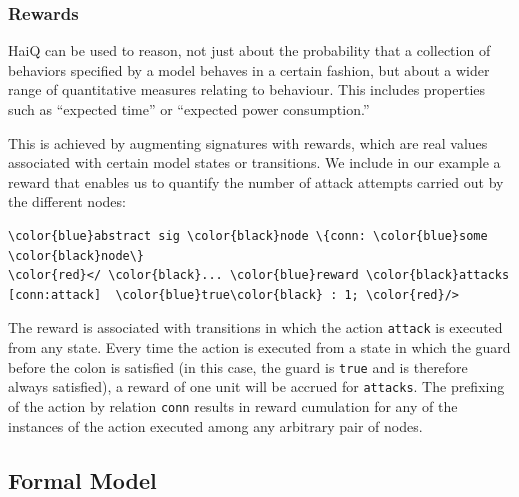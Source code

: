 \documentclass[10pt,journal,compsoc]{IEEEtran}
\begin{document}
\subsubsection{Rewards}
{\sf HaiQ} can be used to reason, not just about the probability that a collection of behaviors specified by a model behaves in a certain fashion, but about a wider range of quantitative measures relating to behaviour. 
This includes properties such as ``expected time'' or ``expected power consumption.'' 

This is achieved by augmenting signatures with rewards, which are real values associated with certain model states or transitions. 
We include in our example a reward that enables us to quantify the number of attack attempts carried out by the different nodes:

{\scriptsize
\begin{Verbatim}[commandchars=\\\{\},codes={\catcode`$=3\catcode`^=7\catcode`_=8}]
\color{blue}abstract sig \color{black}node \{conn: \color{blue}some \color{black}node\}
\color{red}</ \color{black}... \color{blue}reward \color{black}attacks [conn:attack]  \color{blue}true\color{black} : 1; \color{red}/>
\end{Verbatim}
}

The reward is associated with transitions in which the action {\tt attack} is executed from any state. 
Every time the action is executed from a state in which the guard before the colon is satisfied (in this case, the guard is {\tt true} and is therefore always satisfied), a reward of one unit will be accrued for {\tt attacks}.
The prefixing of the action by relation {\tt conn} results in reward cumulation for any of the instances of the action executed among any arbitrary pair of nodes.

\subsection{Formal Model}
\label{subsec:formalmodel}
\end{document}
